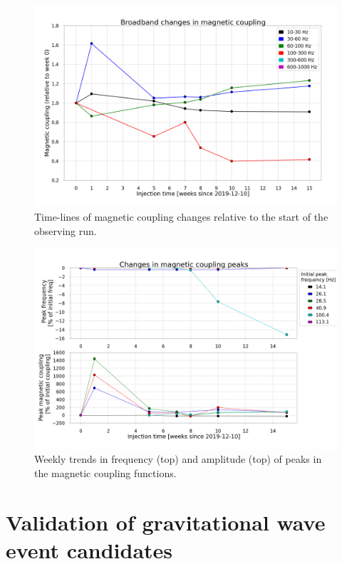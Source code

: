 \begin{figure}[h]
	\centering
	\includegraphics[width=\textwidth]{figures/noise-mag-weekly-bands.png}
	\caption{Time-lines of magnetic coupling changes relative to the start of the observing run.}
	\label{fig:noise-mag-weekly-bands}
\end{figure}

\begin{figure}[h]
	\centering
	\includegraphics[width=\textwidth]{figures/noise-mag-weekly-peaks.png}
	\caption{Weekly trends in frequency (top) and amplitude (top) of peaks in the magnetic coupling functions.}
	\label{fig:noise-mag-weekly-peaks}
\end{figure}

\section{Validation of gravitational wave event candidates}\label{sec:noise-vetting}

